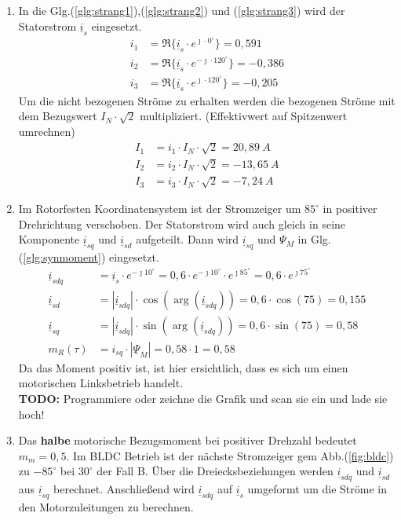 \begin{solution}
\begin{enumerate}
\item In die Glg.(\ref{glg:strang1}),(\ref{glg:strang2}) und (\ref{glg:strang3}) wird der Statorstrom $\underline{i}_s$ eingesetzt.
\begin{align}
i_1 & = \Re \{ \underline{i}_s \cdot e^{\jmath \cdot 0 ^\circ} \} = 0,591\\
i_2 & = \Re \{ \underline{i}_s \cdot e^{-\jmath \cdot 120 ^\circ} \} = -0,386 \\
i_3 & = \Re \{ \underline{i}_s \cdot e^{\jmath \cdot 120 ^\circ} \}=  -0,205
\end{align}
Um die nicht bezogenen Ströme zu erhalten werden die bezogenen Ströme mit dem Bezugswert $I_N \cdot \sqrt{2}$ multipliziert. (Effektivwert auf Spitzenwert umrechnen)
\begin{align}
I_1 & = i_1 \cdot I_N \cdot \sqrt{2}  =20,89~A \\
I_2 & = i_2 \cdot I_N \cdot \sqrt{2} =-13,65~A \\
I_3 & = i_3 \cdot I_N \cdot \sqrt{2} =-7,24~A
\end{align}
\item Im Rotorfesten Koordinatensystem ist der Stromzeiger um $85^\circ$ in positiver Drehrichtung verschoben. Der Statorstrom wird auch gleich in seine Komponente $\underline{i}_{sq}$ und $\underline{i}_{sd}$ aufgeteilt. Dann wird $\underline{i}_{sq}$ und $\Psi_M$ in Glg.(\ref{glg:synmoment}) eingesetzt.
\begin{align}
\underline{i}_{sdq} & = \underline{i}_s \cdot e^{-\jmath 10 ^\circ} = 0,6 \cdot e^{-\jmath 10 ^\circ} \cdot e^{\jmath 85 ^\circ} = 0,6 \cdot e^{\jmath 75 ^\circ} \\
\underline{i}_{sd} & = |\underline{i}_{sdq}| \cdot \cos(\arg(\underline{i}_{sdq})) = 0,6 \cdot \cos(75) = 0,155 \\
\underline{i}_{sq} & = |\underline{i}_{sdq}| \cdot \sin(\arg(\underline{i}_{sdq})) = 0,6 \cdot \sin(75) = 0,58 \\
m_R(\tau)& =  i_{sq} \cdot | \underline{\Psi}_M|= 0,58\cdot 1 = 0,58
\end{align}
Da das Moment positiv ist, ist hier ersichtlich, dass es sich um einen motorischen Linksbetrieb handelt.\\
\textbf{TODO:} Programmiere oder zeichne die Grafik und scan sie ein und lade sie hoch!
\item Das \textbf{halbe} motorische Bezugsmoment bei positiver Drehzahl bedeutet $m_m = 0,5$. Im BLDC Betrieb ist der nächste Stromzeiger gem Abb.(\ref{fig:bldc}) zu $-85^\circ$ bei $30^\circ$ der Fall B. Über die Dreiecksbeziehungen werden $\underline{i}_{sdq}$ und $\underline{i}_{sd}$ aus $\underline{i}_{sq}$ berechnet. Anschließend wird $\underline{i}_{sdq}$ auf $\underline{i}_{s}$ umgeformt um die Ströme in den Motorzuleitungen zu berechnen.

\end{enumerate}
\end{solution}
